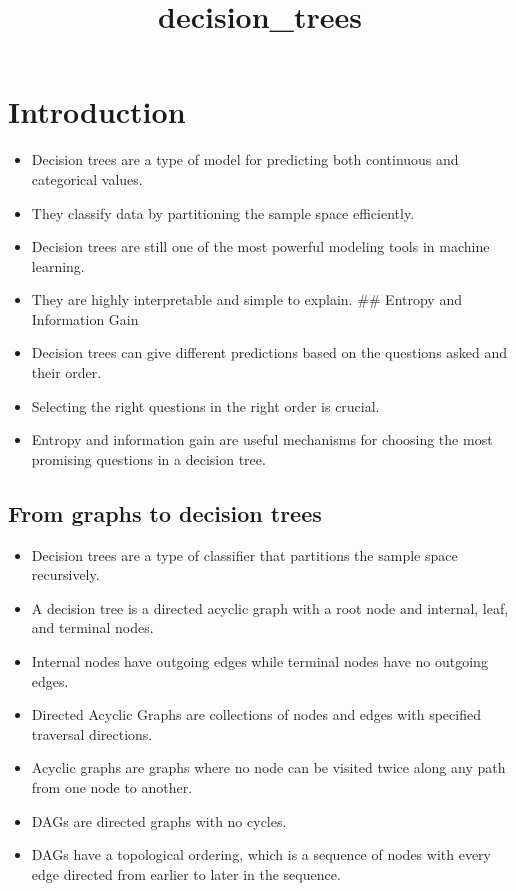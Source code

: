 \documentclass[11pt]{article}
\title{decision\_trees}
\providecommand{\tightlist}{%
      \setlength{\itemsep}{0pt}\setlength{\parskip}{0pt}}
\begin{document}
    
    \maketitle
    
    

    
    \hypertarget{introduction}{%
\section{Introduction}\label{introduction}}

\begin{itemize}
\item
  Decision trees are a type of model for predicting both continuous and
  categorical values.
\item
  They classify data by partitioning the sample space efficiently.
\item
  Decision trees are still one of the most powerful modeling tools in
  machine learning.
\item
  They are highly interpretable and simple to explain. \#\# Entropy and
  Information Gain
\item
  Decision trees can give different predictions based on the questions
  asked and their order.
\item
  Selecting the right questions in the right order is crucial.
\item
  Entropy and information gain are useful mechanisms for choosing the
  most promising questions in a decision tree.
\end{itemize}

\hypertarget{from-graphs-to-decision-trees}{%
\subsection{From graphs to decision
trees}\label{from-graphs-to-decision-trees}}

\begin{itemize}
\tightlist
\item
  Decision trees are a type of classifier that partitions the sample
  space recursively.
\item
  A decision tree is a directed acyclic graph with a root node and
  internal, leaf, and terminal nodes.
\item
  Internal nodes have outgoing edges while terminal nodes have no
  outgoing edges.
\item
  Directed Acyclic Graphs are collections of nodes and edges with
  specified traversal directions.
\item
  Acyclic graphs are graphs where no node can be visited twice along any
  path from one node to another.
\item
  DAGs are directed graphs with no cycles.
\item
  DAGs have a topological ordering, which is a sequence of nodes with
  every edge directed from earlier to later in the sequence.
\end{itemize}
\end{document}
